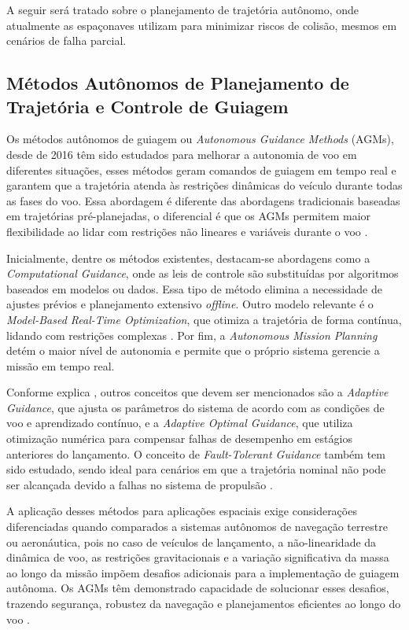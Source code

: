 A seguir será tratado sobre o planejamento de trajetória autônomo, onde atualmente as espaçonaves utilizam para minimizar riscos de colisão, mesmos em cenários de falha parcial.

\subsection{Métodos Autônomos de Planejamento de Trajetória e Controle de Guiagem}

Os métodos autônomos de guiagem ou \textit{Autonomous Guidance Methods}  (AGMs), desde de 2016 têm sido estudados para melhorar a autonomia de voo em diferentes situações, esses métodos geram comandos de guiagem em tempo real e garantem que a trajetória atenda às restrições dinâmicas do veículo durante todas as fases do voo. Essa abordagem é diferente das abordagens tradicionais baseadas em trajetórias pré-planejadas, o diferencial é que os AGMs permitem maior flexibilidade ao lidar com restrições não lineares e variáveis durante o voo \citep{song2023}.

Inicialmente, dentre os métodos existentes, destacam-se abordagens como a \textit{Computational Guidance}, onde as leis de controle são substituídas por algoritmos baseados em modelos ou dados. Essa tipo de método elimina a necessidade de ajustes prévios e planejamento extensivo \textit{offline}. Outro modelo relevante é o \textit{Model-Based Real-Time Optimization}, que otimiza a trajetória de forma contínua, lidando com restrições complexas \citep{song2023}. Por fim, a \textit{Autonomous Mission Planning} detém o maior nível de autonomia e permite que o próprio sistema gerencie a missão em tempo real.

Conforme explica \citep{song2023}, outros conceitos que devem ser mencionados são a \textit{Adaptive Guidance}, que ajusta os parâmetros do sistema de acordo com as condições de voo e aprendizado contínuo, e a \textit{Adaptive Optimal Guidance}, que utiliza otimização numérica para compensar falhas de desempenho em estágios anteriores do lançamento. O conceito de \textit{Fault-Tolerant Guidance} também tem sido estudado, sendo ideal para cenários em que a trajetória nominal não pode ser alcançada devido a falhas no sistema de propulsão \citep{song2023}.

A aplicação desses métodos para aplicações espaciais exige considerações diferenciadas quando comparados a sistemas autônomos de navegação terrestre ou aeronáutica, pois no caso de veículos de lançamento, a não-linearidade da dinâmica de voo, as restrições gravitacionais e a variação significativa da massa ao longo da missão impõem desafios adicionais para a implementação de guiagem autônoma. Os AGMs têm demonstrado capacidade de solucionar esses desafios, trazendo segurança, robustez da navegação e planejamentos eficientes ao longo do voo \citep{song2023}.
